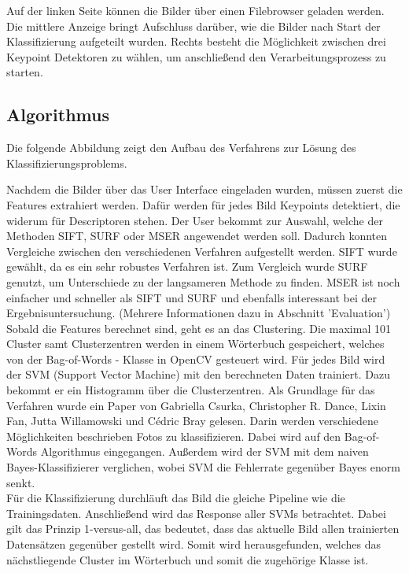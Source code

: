 \documentclass[liststotoc,11pt,a4paper]{article}
\begin{document}

Auf der linken Seite können die Bilder über einen Filebrowser geladen werden. Die mittlere Anzeige bringt Aufschluss darüber, wie die Bilder nach Start der Klassifizierung aufgeteilt wurden. Rechts besteht die Möglichkeit zwischen drei Keypoint Detektoren zu wählen, um anschließend den Verarbeitungsprozess zu starten. %

\subsection{Algorithmus}

Die folgende Abbildung zeigt den Aufbau des Verfahrens zur Lösung des Klassifizierungsproblems.


Nachdem die Bilder über das User Interface eingeladen wurden, müssen zuerst die Features extrahiert werden. Dafür werden für jedes Bild Keypoints detektiert, die widerum für Descriptoren stehen. Der User bekommt zur Auswahl, welche der Methoden SIFT, SURF oder MSER angewendet werden soll. Dadurch konnten Vergleiche zwischen den verschiedenen Verfahren aufgestellt werden. SIFT wurde gewählt, da es ein sehr robustes Verfahren ist. Zum Vergleich wurde SURF genutzt, um Unterschiede zu der langsameren Methode zu finden. MSER ist noch einfacher und schneller als SIFT und SURF und ebenfalls interessant bei der Ergebnisuntersuchung. (Mehrere Informationen dazu in Abschnitt 'Evaluation')
\\Sobald die Features berechnet sind, geht es an das Clustering. Die maximal 101 Cluster samt Clusterzentren werden in einem Wörterbuch gespeichert, welches von der Bag-of-Words - Klasse in OpenCV gesteuert wird. Für jedes Bild wird der SVM (Support Vector Machine) mit den berechneten Daten trainiert. Dazu bekommt er ein Histogramm über die Clusterzentren. Als Grundlage für das Verfahren wurde ein Paper von Gabriella Csurka, Christopher R. Dance, Lixin Fan, Jutta Willamowski und Cédric Bray %
gelesen. \cite{pizza} Darin werden verschiedene Möglichkeiten beschrieben Fotos zu klassifizieren. Dabei wird auf den Bag-of-Words Algorithmus eingegangen. Außerdem wird der SVM mit dem naiven Bayes-Klassifizierer verglichen, wobei SVM die Fehlerrate gegenüber Bayes enorm senkt.
\\Für die Klassifizierung durchläuft das Bild die gleiche Pipeline wie die Trainingsdaten. Anschließend wird das Response aller SVMs betrachtet. Dabei gilt das Prinzip 1-versus-all, das bedeutet, dass das aktuelle Bild allen trainierten Datensätzen gegenüber gestellt wird. Somit wird herausgefunden, welches das nächstliegende Cluster im Wörterbuch und somit die zugehörige Klasse ist.
\end{document}
